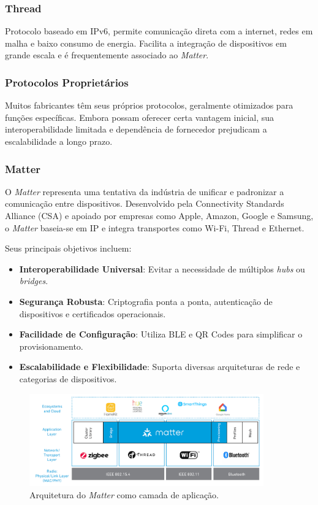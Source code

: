 \subsubsection{Thread}

Protocolo baseado em IPv6, permite comunicação direta com a internet, redes em malha e baixo consumo de energia. Facilita a integração de dispositivos em grande escala e é frequentemente associado ao \textit{Matter}.

\subsubsection{Protocolos Proprietários}

Muitos fabricantes têm seus próprios protocolos, geralmente otimizados para funções específicas. Embora possam oferecer certa vantagem inicial, sua interoperabilidade limitada e dependência de fornecedor prejudicam a escalabilidade a longo prazo.

\subsubsection{Matter}

O \textit{Matter} representa uma tentativa da indústria de unificar e padronizar a comunicação entre dispositivos. Desenvolvido pela Connectivity Standards Alliance (CSA) e apoiado por empresas como Apple, Amazon, Google e Samsung, o \textit{Matter} baseia-se em IP e integra transportes como Wi-Fi, Thread e Ethernet.

Seus principais objetivos incluem:

\begin{itemize}
    \item \textbf{Interoperabilidade Universal}: Evitar a necessidade de múltiplos \textit{hubs} ou \textit{bridges}.
    \item \textbf{Segurança Robusta}: Criptografia ponta a ponta, autenticação de dispositivos e certificados operacionais.
    \item \textbf{Facilidade de Configuração}: Utiliza BLE e QR Codes para simplificar o provisionamento.
    \item \textbf{Escalabilidade e Flexibilidade}: Suporta diversas arquiteturas de rede e categorias de dispositivos.
\end{itemize}

\begin{figure}[thpb]
  \centering
  \includegraphics[width=0.9\textwidth]{DescricaoProcesso/Figuras/matter_big_arc.png}
  \caption{Arquitetura do \textit{Matter} como camada de aplicação.}
  \label{fig:matter-layer}
\end{figure}

